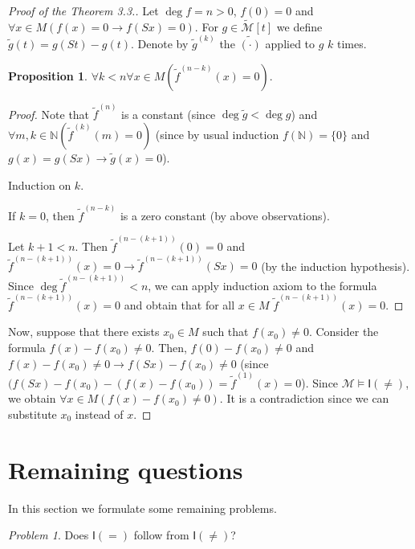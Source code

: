 \documentclass[a4paper,14pt]{article}
\theoremstyle{definition}
\theoremstyle{theorem}
\theoremstyle{lemma}
\theoremstyle{proposition}
\newtheorem{proposition}{Proposition}[section]
\theoremstyle{remark}
\theoremstyle{corollary}
\theoremstyle{problem}
\newtheorem{problem}{Problem}
\theoremstyle{hypothesis}
\begin{document}
\begin{proof}[Proof of the Theorem 3.3.]
    Let $\deg f = n > 0$, $f(0) = 0$ and $\forall x \in M (f(x) = 0 \rightarrow f(Sx) = 0)$. For $g \in \widetilde{\mathcal{M}}[t]$ we define $\tilde g (t) = g(St) - g(t)$. Denote by $\tilde g^{(k)}$ the $\tilde{(\cdot)}$ applied to $g$ $k$ times.
    
    \begin{proposition}
        $\forall k < n \forall x \in M (\tilde f^{(n - k)}(x) = 0)$.
    \end{proposition}
    
    \begin{proof}
        Note that $\tilde f^{(n)}$ is a constant (since $\deg \tilde g < \deg g$) and $\forall m, k \in \mathbb N (\tilde f^{(k)}(m) = 0)$ (since by usual induction $f(\mathbb N) = \{0\}$ and $g(x) = g(Sx) \rightarrow \tilde g(x) = 0$).
    
        Induction on $k$.
        
        If $k = 0$, then $\tilde f^{(n - k)}$ is a zero constant (by above observations).
        
        Let $k + 1 < n$. Then $\tilde f^{(n - (k + 1))}(0) = 0$ and $\tilde f^{(n - (k + 1))}(x) = 0 \rightarrow \tilde f^{(n - (k + 1))}(Sx) = 0$ (by the induction hypothesis). Since $\deg \tilde f^{(n - (k + 1))} < n$, we can apply induction axiom to the formula $\tilde f^{(n - (k + 1))}(x) = 0$ and obtain that for all $x \in M$ $\tilde f^{(n - (k + 1))}(x) = 0$.
    \end{proof}
    
    Now, suppose that there exists $x_0 \in M$ such that $f(x_0) \ne 0$. Consider the formula $f(x) - f(x_0) \ne 0$. Then, $f(0) - f(x_0) \ne 0$ and $f(x) - f(x_0) \ne 0 \rightarrow f(Sx) - f(x_0) \ne 0$ (since $(f(Sx) - f(x_0) - (f(x) - f(x_0)) = \tilde f^{(1)} (x) = 0$). Since $\mathcal{M} \vDash \mathsf{I}(\ne)$, we obtain $\forall x \in M (f(x) - f(x_0) \ne 0)$. It is a contradiction since we can substitute $x_0$ instead of $x$.
\end{proof}

\section{Remaining questions}

In this section we formulate some remaining problems.

\begin{problem}
    Does $\mathsf I(=)$ follow from $\mathsf I(\ne)$?
\end{problem}
\end{document}
